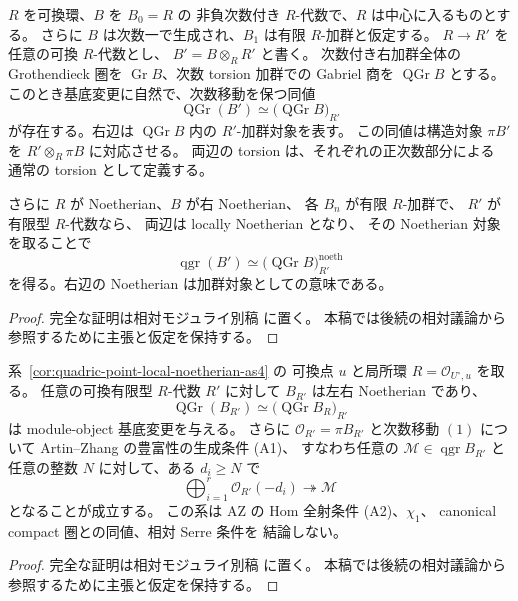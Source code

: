 \begin{lemma}
\label{lem:qgr-module-object-basechange}
$R$ を可換環、$B$ を $B_0=R$ の
非負次数付き $R$-代数で、$R$ は中心に入るものとする。
さらに $B$ は次数一で生成され、$B_1$ は有限 $R$-加群と仮定する。
$R\to R'$ を任意の可換 $R$-代数とし、
$B'=B\otimes_RR'$ と書く。
次数付き右加群全体の Grothendieck 圏を
$\operatorname{Gr}B$、次数 torsion 加群での
Gabriel 商を $\operatorname{QGr}B$ とする。
このとき基底変更に自然で、次数移動を保つ同値
\[
 \operatorname{QGr}(B')
   \simeq \bigl(\operatorname{QGr}B\bigr)_{R'}
 \tag{QGr-BC}\label{eq:qgr-module-objects-basechange}
\]
が存在する。右辺は $\operatorname{QGr}B$ 内の
$R'$-加群対象を表す。
この同値は構造対象 $\pi B'$ を
$R'\otimes_R\pi B$ に対応させる。
両辺の torsion は、それぞれの正次数部分による
通常の torsion として定義する。

さらに $R$ が Noetherian、$B$ が右 Noetherian、
各 $B_n$ が有限 $R$-加群で、
$R'$ が有限型 $R$-代数なら、
両辺は locally Noetherian となり、
その Noetherian 対象を取ることで
\[
 \operatorname{qgr}(B')
   \simeq
    \bigl(\operatorname{QGr}B\bigr)_{R'}^{\mathrm{noeth}}
 \tag{qgr-BC}\label{eq:qgr-noetherian-basechange}
\]
を得る。右辺の Noetherian は加群対象としての意味である。
\end{lemma}
\begin{proof}
完全な証明は相対モジュライ別稿
\cite[相対Koszul・Noetherian基底変更・tailsの節]{QuadricModuli2026} に置く。
本稿では後続の相対議論から参照するために主張と仮定を保持する。
\end{proof}

\begin{corollary}
\label{cor:quadric-local-tails-basechange-generation}
系~\ref{cor:quadric-point-local-noetherian-as4} の
可換点 $u$ と局所環 $R=\mathcal O_{U^\circ,u}$ を取る。
任意の可換有限型 $R$-代数 $R'$ に対して
$B_{R'}$ は左右 Noetherian であり、
\[
 \operatorname{QGr}(B_{R'})
  \simeq\bigl(\operatorname{QGr}B_R\bigr)_{R'}
\]
は module-object 基底変更を与える。
さらに $\mathcal O_{R'}=\pi B_{R'}$ と次数移動 $(1)$ について
Artin--Zhang の豊富性の生成条件 (A1)、
すなわち任意の $\mathcal M\in\operatorname{qgr}B_{R'}$ と
任意の整数 $N$ に対して、ある $d_i\ge N$ で
\[
 \bigoplus_{i=1}^r\mathcal O_{R'}(-d_i)
     \twoheadrightarrow\mathcal M
\]
となることが成立する。
この系は AZ の Hom 全射条件 (A2)、$\chi_1$、
canonical compact 圏との同値、相対 Serre 条件を
結論しない。
\end{corollary}
\begin{proof}
完全な証明は相対モジュライ別稿
\cite[相対Koszul・Noetherian基底変更・tailsの節]{QuadricModuli2026} に置く。
本稿では後続の相対議論から参照するために主張と仮定を保持する。
\end{proof}


